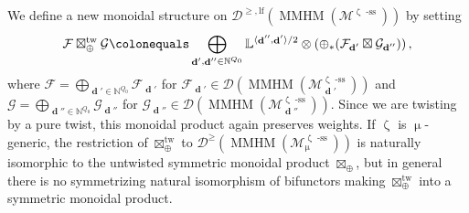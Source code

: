 \documentclass[a4paper,10pt]{amsart}
\renewcommand{\zeta}{\upzeta}
\renewcommand{\mu}{\upmu}
\newcommand{\LL}{\mathbb{L}}
\newcommand{\Msp}{\mathcal{M}}
\DeclareMathOperator{\sst}{-ss}
\DeclareMathOperator{\tw}{tw}
\DeclareMathOperator{\MMHM}{MMHM}
\DeclareMathOperator{\dd}{\mathbf{d}}
\newcommand{\Du}{\mathcal{D}^{\geq}}
\newcommand{\Dulf}{\mathcal{D}^{\geq, \mathrm{lf}}}
\newcommand{\Dub}{\mathcal{D}}
\begin{document}
We define a new monoidal structure on $\Dulf(\MMHM(\Msp^{\zeta\sst}))$ by setting 
\begin{equation}
\mathcal{F}\boxtimes_{\oplus}^{\tw} \mathcal{G}\colonequals \bigoplus_{\dd',\dd''\in\mathbb{N}^{Q_0}} \LL^{\langle \dd'',\dd'\rangle/2}\otimes\left(\oplus_*(\mathcal{F}_{\dd'}\boxtimes\mathcal{G}_{\dd''})\right), 
\end{equation}
where $\mathcal{F}=\bigoplus_{\dd'\in\mathbb{N}^{Q_0}}\mathcal{F}_{\dd'}$ for $\mathcal{F}_{\dd'}\in\Dub(\MMHM(\Msp_{\dd'}^{\zeta\sst}))$ and  $\mathcal{G}=\bigoplus_{\dd''\in\mathbb{N}^{Q_0}}\mathcal{G}_{\dd''}$ for $\mathcal{G}_{\dd''}\in\Dub(\MMHM(\Msp_{\dd''}^{\zeta\sst}))$.  Since we are twisting by a pure twist, this monoidal product again preserves weights.  If $\zeta$ is $\mu$-generic, the restriction of $\boxtimes_{\oplus}^{\tw}$ to $\Du(\MMHM(\Msp^{\zeta\sst}_{\mu}))$ is naturally isomorphic to the untwisted symmetric monoidal product $\boxtimes_{\oplus}$, but in general there is no symmetrizing natural isomorphism of bifunctors making $\boxtimes_{\oplus}^{\tw}$ into a symmetric monoidal product.  
\end{document}
